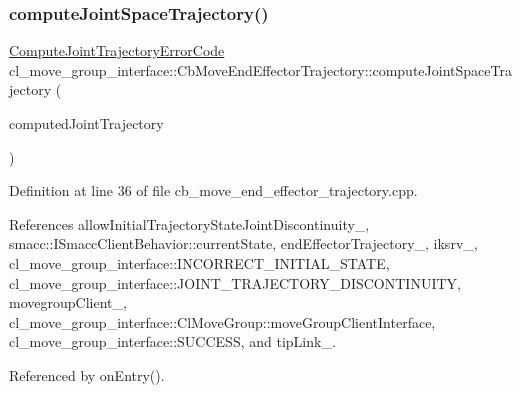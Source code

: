 \subsubsection{\texorpdfstring{compute\+Joint\+Space\+Trajectory()}{computeJointSpaceTrajectory()}}
{\footnotesize\ttfamily \hyperlink{namespacecl__move__group__interface_ae5fc1caf9a16ae5ad1c97c2e137a7017}{Compute\+Joint\+Trajectory\+Error\+Code} cl\+\_\+move\+\_\+group\+\_\+interface\+::\+Cb\+Move\+End\+Effector\+Trajectory\+::compute\+Joint\+Space\+Trajectory (\begin{DoxyParamCaption}\item[{moveit\+\_\+msgs\+::\+Robot\+Trajectory \&}]{computed\+Joint\+Trajectory }\end{DoxyParamCaption})\hspace{0.3cm}{\ttfamily [protected]}}



Definition at line 36 of file cb\+\_\+move\+\_\+end\+\_\+effector\+\_\+trajectory.\+cpp.



References allow\+Initial\+Trajectory\+State\+Joint\+Discontinuity\+\_\+, smacc\+::\+I\+Smacc\+Client\+Behavior\+::current\+State, end\+Effector\+Trajectory\+\_\+, iksrv\+\_\+, cl\+\_\+move\+\_\+group\+\_\+interface\+::\+I\+N\+C\+O\+R\+R\+E\+C\+T\+\_\+\+I\+N\+I\+T\+I\+A\+L\+\_\+\+S\+T\+A\+TE, cl\+\_\+move\+\_\+group\+\_\+interface\+::\+J\+O\+I\+N\+T\+\_\+\+T\+R\+A\+J\+E\+C\+T\+O\+R\+Y\+\_\+\+D\+I\+S\+C\+O\+N\+T\+I\+N\+U\+I\+TY, movegroup\+Client\+\_\+, cl\+\_\+move\+\_\+group\+\_\+interface\+::\+Cl\+Move\+Group\+::move\+Group\+Client\+Interface, cl\+\_\+move\+\_\+group\+\_\+interface\+::\+S\+U\+C\+C\+E\+SS, and tip\+Link\+\_\+.



Referenced by on\+Entry().



